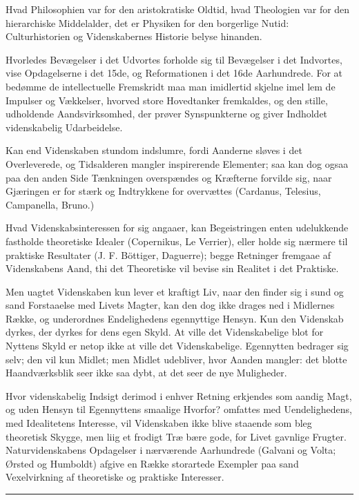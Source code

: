 \documentclass[12pt]{book}
\newcommand{\opage}[1]{\marginnote{\footnotesize\textit{[#1]}}}
\begin{document}
Hvad Philosophien var for den aristokratiske Oldtid, hvad Theologien var for den
hierarchiske Middelalder, det er Physiken for den borgerlige Nutid: Culturhistorien og
Videnskabernes Historie belyse hinanden.

Hvorledes Bevægelser i det Udvortes forholde sig til Bevægelser i det Indvortes, vise
Opdagelserne i det 15de, og Reformationen i det 16de Aarhundrede. For at bedømme de
intellectuelle Fremskridt maa man imidlertid skjelne imel%
\opage{69}lem de Impulser og Vækkelser, hvorved store Hovedtanker fremkaldes, og den stille,
udholdende Aandsvirksomhed, der prøver Synspunkterne og giver Indholdet videnskabelig
Udarbeidelse.

Kan end Videnskaben stundom indslumre, fordi Aanderne sløves i det Overleverede, og
Tidsalderen mangler inspirerende Elementer; saa kan dog ogsaa paa den anden Side
Tænkningen overspændes og Kræfterne forvilde sig, naar Gjæringen er for stærk og
Indtrykkene for overvættes (Cardanus, Telesius, Campanella, Bruno.)

Hvad Videnskabsinteressen for sig angaaer, kan Begeistringen enten udelukkende
fastholde theoretiske Idealer (Copernikus, Le Verrier), eller holde sig nærmere til
praktiske Resultater (J. F. Böttiger, Daguerre); begge Retninger fremgaae af
Videnskabens Aand, thi det Theoretiske vil bevise sin Realitet i det Praktiske.

Men uagtet Videnskaben kun lever et kraftigt Liv, naar den finder sig i sund og sand
Forstaaelse med Livets Magter, kan den dog ikke drages ned i Midlernes Række, og
underordnes Endelighedens egennyttige Hensyn. Kun den Videnskab dyrkes, der dyrkes for
dens egen Skyld. At ville det Videnskabelige blot for Nyttens Skyld er netop ikke at
ville det Videnskabelige. Egennytten bedrager sig selv; den vil kun Midlet; men Midlet
udebliver, hvor Aanden mangler: det blotte Haandværksblik seer ikke saa dybt, at det
seer de nye Muligheder.

Hvor videnskabelig Indsigt derimod i enhver Retning erkjendes som aandig Magt, og uden
Hensyn til Egennyttens smaalige Hvorfor? omfattes med Uendelighedens, med Idealitetens
Interesse, vil Videnskaben ikke blive staaende som bleg theoretisk Skygge, men liig et
frodigt Træ bære gode, for Livet gavnlige Frugter. Naturvidenskabens Opdagelser i
nærværende Aarhundrede (Galvani og Volta; Ørsted og Humboldt) afgive en Række
storartede Exempler paa sand Vexelvirkning af theoretiske og praktiske Interesser.

\begin{center}\rule{0.35\linewidth}{0.4pt}\end{center}
\end{document}
